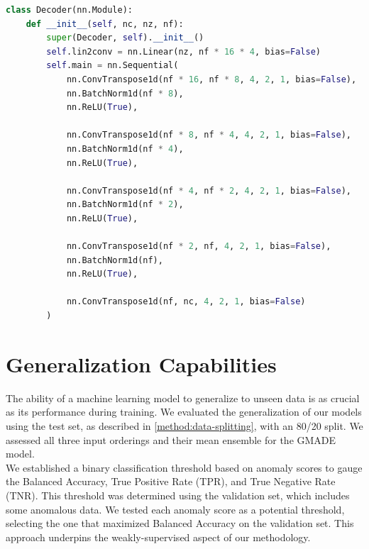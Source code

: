 \begin{lstlisting}[label=code:decoder,language=Python,caption={Overview of the decoder architecture with nc (number of input channels), nz (size of latent space) and nf (depth of feature maps)}]
    class Decoder(nn.Module):
    def __init__(self, nc, nz, nf):
        super(Decoder, self).__init__()
        self.lin2conv = nn.Linear(nz, nf * 16 * 4, bias=False)
        self.main = nn.Sequential(
            nn.ConvTranspose1d(nf * 16, nf * 8, 4, 2, 1, bias=False),
            nn.BatchNorm1d(nf * 8),
            nn.ReLU(True),

            nn.ConvTranspose1d(nf * 8, nf * 4, 4, 2, 1, bias=False),
            nn.BatchNorm1d(nf * 4),
            nn.ReLU(True),

            nn.ConvTranspose1d(nf * 4, nf * 2, 4, 2, 1, bias=False),
            nn.BatchNorm1d(nf * 2),
            nn.ReLU(True),

            nn.ConvTranspose1d(nf * 2, nf, 4, 2, 1, bias=False),
            nn.BatchNorm1d(nf),
            nn.ReLU(True),

            nn.ConvTranspose1d(nf, nc, 4, 2, 1, bias=False)
        )
\end{lstlisting}
\section{Generalization Capabilities}
The ability of a machine learning model to generalize to unseen data is as crucial as its performance during training. We evaluated the generalization of our models using the test set, as described in \autoref{method:data-splitting}, with an 80/20 split. We assessed all three input orderings and their mean ensemble for the GMADE model.\\
We established a binary classification threshold based on anomaly scores to gauge the Balanced Accuracy, True Positive Rate (TPR), and True Negative Rate (TNR). This threshold was determined using the validation set, which includes some anomalous data. We tested each anomaly score as a potential threshold, selecting the one that maximized Balanced Accuracy on the validation set. This approach underpins the weakly-supervised aspect of our methodology.

